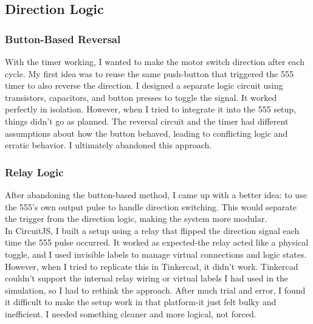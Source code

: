 \documentclass{article}
\begin{document}
\subsection{Direction Logic}
\subsubsection{Button-Based Reversal}
With the timer working, I wanted to make the motor {switch direction} after each cycle. My first idea was to {reuse the same push-button} that triggered the 555 timer to also reverse the direction. I designed a separate logic circuit using transistors, capacitors, and button presses to toggle the signal. It worked perfectly in isolation. However, when I tried to integrate it into the 555 setup, things didn’t go as planned. The reversal circuit and the timer had different assumptions about how the button behaved, leading to conflicting logic and erratic behavior. I ultimately abandoned this approach.

\subsubsection{Relay Logic}
After abandoning the button-based method, I came up with a better idea: to use the {555’s own output pulse} to handle direction switching. This would separate the trigger from the direction logic, making the system more modular.\\[8pt]
In {CircuitJS}, I built a setup using a {relay} that flipped the direction signal each time the 555 pulse occurred. It worked as expected-the relay acted like a physical toggle, and I used invisible labels to manage virtual connections and logic states.\\[8pt]
However, when I tried to replicate this in {Tinkercad}, it didn’t work. Tinkercad couldn’t support the internal relay wiring or virtual labels I had used in the simulation, so I had to rethink the approach. After much trial and error, I found it difficult to make the setup work in that platform-it just felt bulky and inefficient. I needed something cleaner and more logical, not forced.
\end{document}
